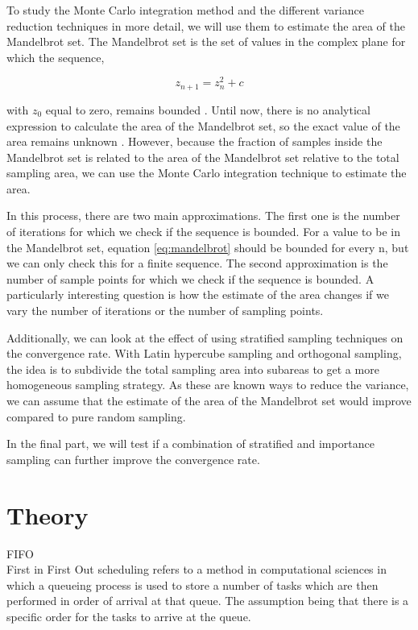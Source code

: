 \documentclass{uva-inf-article}
\begin{document}
To study the Monte Carlo integration method and the different variance reduction techniques in more detail, we will use them to estimate the area of the Mandelbrot set. The Mandelbrot set is the set of values in the complex plane for which the sequence,

\begin{equation}
    z_{n + 1} = z_n^2 + c
    \label{eq:mandelbrot}
\end{equation}

with $z_0$ equal to zero, remains bounded \parencite{ewing1992}.
Until now, there is no analytical expression to calculate the area of the Mandelbrot set, so the exact value of the area remains unknown \parencite{bittner2017}.
However, because the fraction of samples inside the Mandelbrot set is related to the area of the Mandelbrot set relative to the total sampling area, we can use the Monte Carlo integration technique to estimate the area.

In this process, there are two main approximations. The first one is the number of iterations for which we check if the sequence is bounded. For a value to be in the Mandelbrot set, equation \ref{eq:mandelbrot} should be bounded for every n, but we can only check this for a finite sequence. The second approximation is the number of sample points for which we check if the sequence is bounded. A particularly interesting question is how the estimate of the area changes if we vary the number of iterations or the number of sampling points.

Additionally, we can look at the effect of using stratified sampling techniques on the convergence rate. With Latin hypercube sampling \parencite{wei1996} and orthogonal sampling, the idea is to subdivide the total sampling area into subareas to get a more homogeneous sampling strategy. As these are known ways to reduce the variance, we can assume that the estimate of the area of the Mandelbrot set would improve compared to pure random sampling.

In the final part, we will test if a combination of stratified and importance sampling can further improve the convergence rate.

\section{Theory}
    
    FIFO\\
    First in First Out scheduling refers to a method in computational sciences in which a queueing 
    process is used to store a number of tasks which are then performed in order of arrival 
    at that queue. The assumption being that there is a specific order for the tasks to arrive at
    the queue.\\
    
\end{document}
